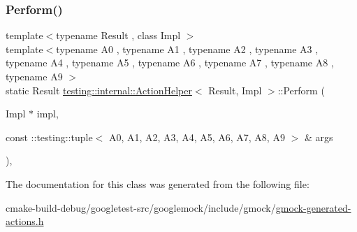 \mbox{\label{classtesting_1_1internal_1_1ActionHelper_adfe6c86332cc09b352ec5ccbad1d3988}} 
\subsubsection{\texorpdfstring{Perform()}{Perform()}\hspace{0.1cm}{\footnotesize\ttfamily [11/11]}}
{\footnotesize\ttfamily template$<$typename Result , class Impl $>$ \\
template$<$typename A0 , typename A1 , typename A2 , typename A3 , typename A4 , typename A5 , typename A6 , typename A7 , typename A8 , typename A9 $>$ \\
static Result \mbox{\hyperlink{classtesting_1_1internal_1_1ActionHelper}{testing\+::internal\+::\+Action\+Helper}}$<$ Result, Impl $>$\+::Perform (\begin{DoxyParamCaption}\item[{Impl $\ast$}]{impl,  }\item[{const \+::testing\+::tuple$<$ A0, A1, A2, A3, A4, A5, A6, A7, A8, A9 $>$ \&}]{args }\end{DoxyParamCaption})\hspace{0.3cm}{\ttfamily [inline]}, {\ttfamily [static]}}



The documentation for this class was generated from the following file\+:\begin{DoxyCompactItemize}
\item 
cmake-\/build-\/debug/googletest-\/src/googlemock/include/gmock/\mbox{\hyperlink{gmock-generated-actions_8h}{gmock-\/generated-\/actions.\+h}}\end{DoxyCompactItemize}
